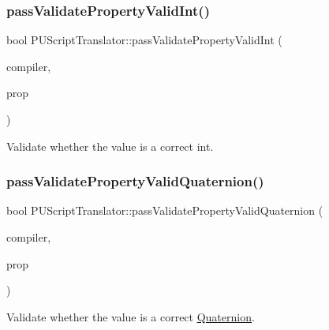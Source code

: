 \subsubsection{\texorpdfstring{pass\+Validate\+Property\+Valid\+Int()}{passValidatePropertyValidInt()}\hspace{0.1cm}{\footnotesize\ttfamily [2/2]}}
{\footnotesize\ttfamily bool P\+U\+Script\+Translator\+::pass\+Validate\+Property\+Valid\+Int (\begin{DoxyParamCaption}\item[{\hyperlink{classPUScriptCompiler}{P\+U\+Script\+Compiler} $\ast$}]{compiler,  }\item[{\hyperlink{classPUPropertyAbstractNode}{P\+U\+Property\+Abstract\+Node} $\ast$}]{prop }\end{DoxyParamCaption})}

Validate whether the value is a correct int. \mbox{\label{classPUScriptTranslator_a94972ffef7d58c1537e3868d50c89dbf}} 
\subsubsection{\texorpdfstring{pass\+Validate\+Property\+Valid\+Quaternion()}{passValidatePropertyValidQuaternion()}\hspace{0.1cm}{\footnotesize\ttfamily [1/2]}}
{\footnotesize\ttfamily bool P\+U\+Script\+Translator\+::pass\+Validate\+Property\+Valid\+Quaternion (\begin{DoxyParamCaption}\item[{\hyperlink{classPUScriptCompiler}{P\+U\+Script\+Compiler} $\ast$}]{compiler,  }\item[{\hyperlink{classPUPropertyAbstractNode}{P\+U\+Property\+Abstract\+Node} $\ast$}]{prop }\end{DoxyParamCaption})}

Validate whether the value is a correct \hyperlink{classQuaternion}{Quaternion}. \mbox{\label{classPUScriptTranslator_a94972ffef7d58c1537e3868d50c89dbf}} 
